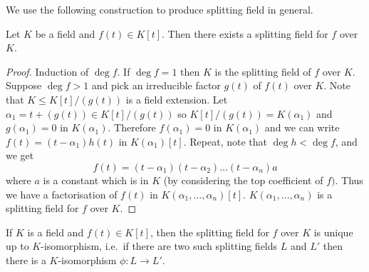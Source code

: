 \documentclass[a4paper]{article}
\begin{document}
We use the following construction to produce splitting field in general.

\begin{theorem}
  Let \(K\) be a field and \(f(t) \in K[t]\). Then there exists a splitting field for \(f\) over \(K\).
\end{theorem}

\begin{proof}
  Induction of \(\deg f\). If \(\deg f = 1\) then \(K\) is the splitting field of \(f\) over \(K\). Suppose \(\deg f > 1\) and pick an irreducible factor \(g(t)\) of \(f(t)\) over \(K\). Note that \(K \leq K[t]/(g(t))\) is a field extension. Let \(\alpha_1 = t + (g(t)) \in K[t]/(g(t))\) so \(K[t]/(g(t)) = K(\alpha_1)\) and \(g(\alpha_1) = 0\) in \(K(\alpha_1)\). Therefore \(f(\alpha_1) = 0\) in \(K(\alpha_1)\) and we can write \(f(t) = (t - \alpha_1) h(t)\) in \(K(\alpha_1)[t]\). Repeat, note that \(\deg h < \deg f\), and we get
  \[
    f(t) = (t - \alpha_1) (t - \alpha_2) \dots (t - \alpha_n) a
  \]
  where \(a\) is a constant which is in \(K\) (by considering the top coefficient of \(f)\). Thus we have a factorisation of \(f(t)\) in \(K(\alpha_1, \dots, \alpha_n)[t]\). \(K(\alpha_1, \dots, \alpha_n)\) is a splitting field for \(f\) over \(K\).
\end{proof}

\begin{theorem}
  If \(K\) is a field and \(f(t) \in K[t]\), then the splitting field for \(f\) over \(K\) is unique up to \(K\)-isomorphism, i.e.\ if there are two such splitting fields \(L\) and \(L'\) then there is a \(K\)-isomorphism \(\phi: L \to L'\).
\end{theorem}
\end{document}
